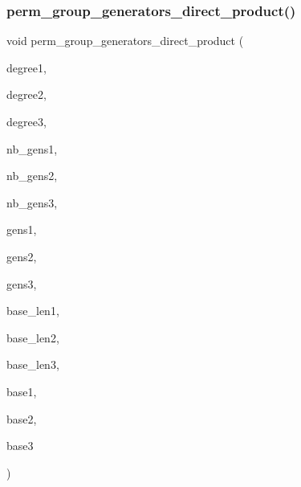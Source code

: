 \subsubsection{\texorpdfstring{perm\+\_\+group\+\_\+generators\+\_\+direct\+\_\+product()}{perm\_group\_generators\_direct\_product()}\hspace{0.1cm}{\footnotesize\ttfamily [1/2]}}
{\footnotesize\ttfamily void perm\+\_\+group\+\_\+generators\+\_\+direct\+\_\+product (\begin{DoxyParamCaption}\item[{\mbox{\hyperlink{galois_8h_a09fddde158a3a20bd2dcadb609de11dc}{I\+NT}}}]{degree1,  }\item[{\mbox{\hyperlink{galois_8h_a09fddde158a3a20bd2dcadb609de11dc}{I\+NT}}}]{degree2,  }\item[{\mbox{\hyperlink{galois_8h_a09fddde158a3a20bd2dcadb609de11dc}{I\+NT}} \&}]{degree3,  }\item[{\mbox{\hyperlink{galois_8h_a09fddde158a3a20bd2dcadb609de11dc}{I\+NT}}}]{nb\+\_\+gens1,  }\item[{\mbox{\hyperlink{galois_8h_a09fddde158a3a20bd2dcadb609de11dc}{I\+NT}}}]{nb\+\_\+gens2,  }\item[{\mbox{\hyperlink{galois_8h_a09fddde158a3a20bd2dcadb609de11dc}{I\+NT}} \&}]{nb\+\_\+gens3,  }\item[{\mbox{\hyperlink{galois_8h_a09fddde158a3a20bd2dcadb609de11dc}{I\+NT}} $\ast$}]{gens1,  }\item[{\mbox{\hyperlink{galois_8h_a09fddde158a3a20bd2dcadb609de11dc}{I\+NT}} $\ast$}]{gens2,  }\item[{\mbox{\hyperlink{galois_8h_a09fddde158a3a20bd2dcadb609de11dc}{I\+NT}} $\ast$\&}]{gens3,  }\item[{\mbox{\hyperlink{galois_8h_a09fddde158a3a20bd2dcadb609de11dc}{I\+NT}}}]{base\+\_\+len1,  }\item[{\mbox{\hyperlink{galois_8h_a09fddde158a3a20bd2dcadb609de11dc}{I\+NT}}}]{base\+\_\+len2,  }\item[{\mbox{\hyperlink{galois_8h_a09fddde158a3a20bd2dcadb609de11dc}{I\+NT}} \&}]{base\+\_\+len3,  }\item[{\mbox{\hyperlink{galois_8h_a09fddde158a3a20bd2dcadb609de11dc}{I\+NT}} $\ast$}]{base1,  }\item[{\mbox{\hyperlink{galois_8h_a09fddde158a3a20bd2dcadb609de11dc}{I\+NT}} $\ast$}]{base2,  }\item[{\mbox{\hyperlink{galois_8h_a09fddde158a3a20bd2dcadb609de11dc}{I\+NT}} $\ast$\&}]{base3 }\end{DoxyParamCaption})}

